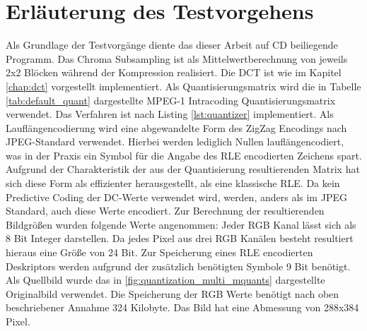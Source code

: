 \chapter{Erläuterung des Testvorgehens}
\label{chap:testvorgenen}

Als Grundlage der Testvorgänge diente das dieser Arbeit auf CD beiliegende Programm. Das Chroma Subsampling ist als Mittelwertberechnung von jeweils 2x2 Blöcken während der Kompression realisiert. Die DCT ist wie im Kapitel \ref{chap:dct} vorgestellt implementiert. Als Quantisierungsmatrix wird die in Tabelle \ref{tab:default_quant} dargestellte MPEG-1 Intracoding Quantisierungsmatrix verwendet. Das Verfahren ist nach Listing \ref{lst:quantizer} implementiert. Als Lauflängencodierung wird eine abgewandelte Form des ZigZag Encodings nach JPEG-Standard verwendet. Hierbei werden lediglich Nullen lauflängencodiert, was in der Praxis ein Symbol für die Angabe des RLE encodierten Zeichens spart. Aufgrund der Charakteristik der aus der Quantisierung resultierenden Matrix hat sich diese Form als effizienter herausgestellt, als eine klassische RLE. Da kein Predictive Coding der DC-Werte verwendet wird, werden, anders als im JPEG Standard, auch diese Werte encodiert. Zur Berechnung der resultierenden Bildgrößen wurden folgende Werte angenommen: Jeder RGB Kanal lässt sich als 8 Bit Integer darstellen. Da jedes Pixel aus drei RGB Kanälen besteht resultiert hieraus eine Größe von 24 Bit. Zur Speicherung eines RLE encodierten Deskriptors werden aufgrund der zusätzlich benötigten Symbole 9 Bit benötigt. Als Quellbild wurde das in \ref{fig:quantization_multi_mquants} dargestellte Originalbild verwendet. Die Speicherung der RGB Werte benötigt nach oben beschriebener Annahme 324 Kilobyte. Das Bild hat eine Abmessung von 288x384 Pixel.
